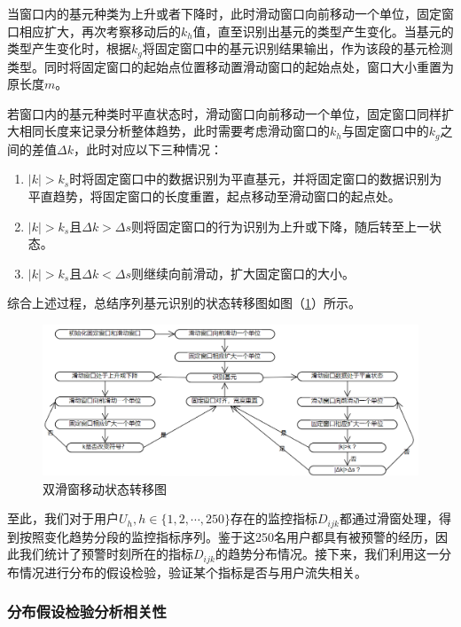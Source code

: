 \documentclass{my_paper}
\begin{document}
当窗口内的基元种类为上升或者下降时，此时滑动窗口向前移动一个单位，固定窗口相应扩大，再次考察移动后的$k_h$值，直至识别出基元的类型产生变化。当基元的类型产生变化时，根据$k_g$将固定窗口中的基元识别结果输出，作为该段的基元检测类型。同时将固定窗口的起始点位置移动置滑动窗口的起始点处，窗口大小重置为原长度$m$。

若窗口内的基元种类时平直状态时，滑动窗口向前移动一个单位，固定窗口同样扩大相同长度来记录分析整体趋势，此时需要考虑滑动窗口的$k_h$与固定窗口中的$k_g$之间的差值$\Delta k$，此时对应以下三种情况：

\begin{enumerate}
    \item $|k|>k_s$时将固定窗口中的数据识别为平直基元，并将固定窗口的数据识别为平直趋势，将固定窗口的长度重置，起点移动至滑动窗口的起点处。
    \item $|k|>k_s$且$\Delta k > \Delta s$则将固定窗口的行为识别为上升或下降，随后转至上一状态。
    \item $|k|>k_s$且$\Delta k < \Delta s$则继续向前滑动，扩大固定窗口的大小。
\end{enumerate}

综合上述过程，总结序列基元识别的状态转移图如图（\ref{slide}）所示。

\begin {figure}[h]
\centering %
\includegraphics[width=\textwidth]{slide.png}
\caption{双滑窗移动状态转移图} %
\label{slide}
\end {figure}

至此，我们对于用户$U_h,h\in\{1,2,\cdots ,250\}$存在的监控指标$D_{ijk}$都通过滑窗处理，得到按照变化趋势分段的监控指标序列。鉴于这250名用户都具有被预警的经历，因此我们统计了预警时刻所在的指标$D_{ijk}$的趋势分布情况。接下来，我们利用这一分布情况进行分布的假设检验，验证某个指标是否与用户流失相关。

\subsubsection{分布假设检验分析相关性}
\end{document}
